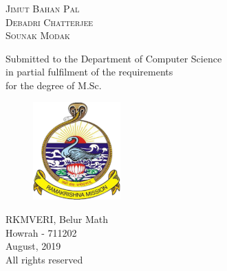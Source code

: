 \documentclass[a4paper, 11pt, oneside]{book} %
\begin{document}
\begin{titlepage}
	{\scshape\Large Jimut Bahan Pal \\ Debadri Chatterjee \\ Sounak Modak \\} %
	
	\vspace{0.5\baselineskip} %
	\vspace{0.5\baselineskip}
	\vspace{0.5\baselineskip}
	\vspace{0.5\baselineskip}
	
	Submitted to the Department of Computer Science\\
	in partial fulfilment of the requirements \\
	for the degree of M.Sc. 
	\vspace{0.5\baselineskip}
	\vspace{0.5\baselineskip}

	
		
	 \begin{figure}[h!]
		\centering
		\includegraphics[width=0.30\textwidth]{logo.png}
	
	\end{figure}
		
	\vspace{0.3\baselineskip} %
	
	
	{RKMVERI, Belur Math\\}
	Howrah - 711202 \\
	August, 2019 \\ %
	{\tiny \textcopyright \space All rights reserved }
	

\end{titlepage}

\end{document}
